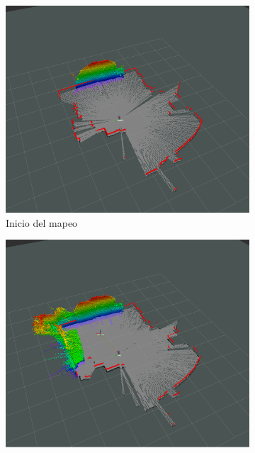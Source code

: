 \begin{figure}[H]
    \centering
    \begin{subfigure}[b]{0.30\textwidth}
    \includegraphics[width=\textwidth, height=\textwidth]{figures/05experimentacion/ambiente_1/r00_01.png}
    \caption{Inicio del mapeo}
    \label{fig:ambiente_1_1}
    \end{subfigure}
    \begin{subfigure}[b]{0.30\textwidth}
    \includegraphics[width=\textwidth, height=\textwidth]{figures/05experimentacion/ambiente_1/r00_02.png}

\end{subfigure}
\end{figure}
